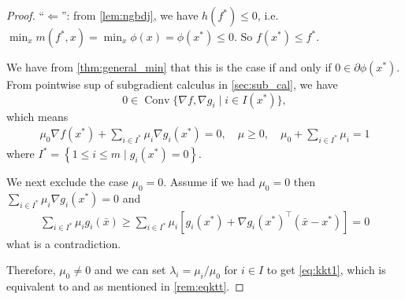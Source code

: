 \documentclass{article}
\newcommand*\circled[1]{\tikz[baseline=(char.base)]{
    \node[shape=circle, draw, inner sep=0.1pt, 
        minimum height=5pt] (char) {\vphantom{1g}#1};}}
\newcommand{\Conv}{\operatorname{Conv}}
\begin{document}
\begin{proof}
``$\Leftarrow$'': from \cref{lem:ngbdj}, we have $h(f^*)\le 0$, i.e. $\min_x m(f^*,x) =\min_x \phi(x) = \phi(x^*)\le 0$. So $f(x^*)\le f^*$.

We have from \cref{thm:general_min} that this is the case if and only if $0 \in \partial \phi\left(x^{*}\right)$. From pointwise sup of subgradient calculus in \cref{sec:sub_cal}, we have $$0\in \Conv\{\nabla f,\nabla g_i\mid i\in I(x^*)\},$$ which means
\begin{align*}
\mu_{0} \nabla f\left(x^{*}\right)+\sum_{i \in I^{*}} \mu_{i} \nabla g_{i}\left(x^{*}\right)=0, \quad \mu \geq 0, \quad \mu_{0}+\sum_{i \in I^{*}} \mu_{i}=1
\end{align*}
where $I^{*}=\left\{1 \leq i \leq m \mid g_{i}\left(x^{*}\right)=0\right\} .$ 

We next exclude the case $\mu_{0}=0$. Assume if we had $\mu_{0}=0$ then $\sum_{i \in I^{*}} \mu_{i}\nabla g_{i}\left(x^{*}\right)=0$ and
\begin{align*}
\sum_{i \in I^{*}} \mu_{i} g_{i}(\bar{x}) \geq \sum_{i \in I^{*}} \mu_{i}\left[g_{i}\left(x^{*}\right)+\nabla g_{i}\left(x^{*}\right)^{\top}\left(\bar{x}-x^{*}\right)\right]=0
\end{align*}
what is a contradiction. 

Therefore, $\mu_{0} \neq 0$ and we can set $\lambda_{i}=\mu_{i} / \mu_{0}$ for $i \in I$ to get \cref{eq:kkt1}, which is equivalent to \circled{1} and \circled{2} as mentioned in \cref{rem:eqktt}.
\end{proof}
\end{document}
